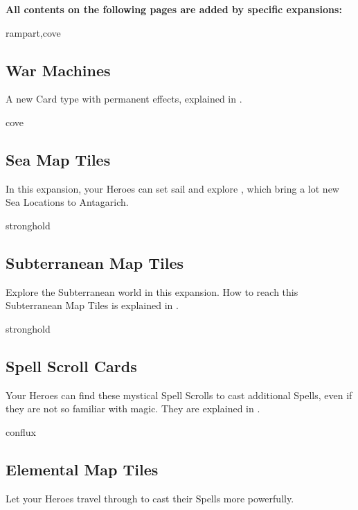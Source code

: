 \textbf{All contents on the following pages are added by specific expansions:}
\begin{multicols*}{2}

\begin{expansion}{rampart,cove}
\subsection*{War Machines}
  A new Card type with permanent effects, explained in .
\end{expansion}

\vspace*{1em}
\begin{expansion}{cove}
   \subsection*{Sea Map Tiles}
   In this expansion, your Heroes can set sail and explore , which bring a lot new Sea Locations to Antagarich.
\end{expansion}

\vspace*{1em}
\begin{expansion}{stronghold}
   \subsection*{Subterranean Map Tiles}
   Explore the Subterranean world in this expansion.
   How to reach this Subterranean Map Tiles is explained in .
\end{expansion}

\vspace*{1em}
\begin{expansion}{stronghold}
   \subsection*{Spell Scroll Cards}
   Your Heroes can find these mystical Spell Scrolls to cast additional Spells, even if they are not so familiar with magic.
   They are explained in . %
\end{expansion}

\vspace*{1em}
\begin{expansion}{conflux}
   \subsection*{Elemental Map Tiles}
   Let your Heroes travel through  to cast their Spells more powerfully.
\end{expansion}


\end{multicols*}
